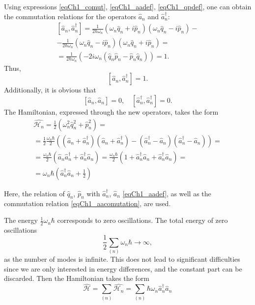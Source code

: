 Using expressions \eqref{eqCh1_comut}, 
\eqref{eqCh1_aadef}, \eqref{eqCh1_qpdef}, one can obtain the commutation
relations for the operators $\hat{a}_n$ and $\hat{a}_n^{\dag}$:
\begin{eqnarray}
\left[\hat{a}_n, \hat{a}_n^{\dag}\right] = 
\frac{1}{2 \hbar \omega_n}
\left( \omega_n \hat{q}_n + i \hat{p}_n\right) 
\left( \omega_n \hat{q}_n - i \hat{p}_n\right) - 
\nonumber \\
- \frac{1}{2 \hbar \omega_n}
\left( \omega_n \hat{q}_n - i \hat{p}_n\right) 
\left( \omega_n \hat{q}_n + i \hat{p}_n\right) =
\nonumber \\
= \frac{1}{2 \hbar \omega_n}
\left( - 2 i \omega_n 
\left(\hat{q}_n \hat{p}_n - \hat{p}_n \hat{q}_n\right)\right) = 1.
\end{eqnarray}
Thus,
\begin{equation}
\left[\hat{a}_n, \hat{a}_n^{\dag}\right] = 1.
\label{eqCh1_aacomutation}
\end{equation}
Additionally, it is obvious that
\begin{equation}
\left[\hat{a}_n, \hat{a}_n\right] = 0,
\quad
\left[\hat{a}_n^{\dag}, \hat{a}_n^{\dag}\right] = 0.
\end{equation}
The Hamiltonian, expressed through the new operators, takes the form
\begin{eqnarray}
\hat{\mathcal{H}_n} = 
\frac{1}{2}\left(\omega_n^2 \hat{q}_n^2 + \hat{p}_n^2\right) = 
\nonumber \\
= \frac{1}{2}\frac{\omega_n \hbar}{2}
\left(
\left(\hat{a}_n + \hat{a}_n^{\dag} \right)
\left(\hat{a}_n + \hat{a}_n^{\dag} \right)
-
\left(\hat{a}_n^{\dag} - \hat{a}_n \right)
\left(\hat{a}_n^{\dag} - \hat{a}_n \right)
\right) =
\nonumber \\
= \frac{\omega_n \hbar}{2} 
\left( \hat{a}_n \hat{a}_n^{\dag} + \hat{a}_n^{\dag} \hat{a}_n\right) =
\frac{\omega_n \hbar}{2} 
\left(1 + \hat{a}_n^{\dag} \hat{a}_n + \hat{a}_n^{\dag} \hat{a}_n\right) =
\nonumber \\
= \omega_n \hbar 
\left(\hat{a}_n^{\dag} \hat{a}_n + \frac{1}{2}\right)
\label{eqCh1_quant_stoyachie_volny}
\end{eqnarray}

Here, the relation of $\hat{q}_n$, $\hat{p}_n$
with $\hat{a}_n^{\dag}$, $\hat{a}_n$ \eqref{eqCh1_aadef}, as well as the
commutation relation \eqref{eqCh1_aacomutation}, are used.

The energy $\frac{1}{2}\omega_n \hbar$ corresponds to zero
oscillations. The total energy of zero oscillations
\[
\frac{1}{2}\sum_{(n)}\omega_n \hbar \to \infty,
\] 
as the number of modes is infinite. This does not lead to 
significant difficulties since we are only interested in energy differences, and the constant part can be discarded. Then the Hamiltonian
takes the form 
\begin{equation}
\hat{\mathcal{H}} = \sum_{(n)}\hat{\mathcal{H}_n} =
\sum_{(n)}\hbar \omega_n \hat{a}_n^{\dag}\hat{a}_n
\end{equation}


